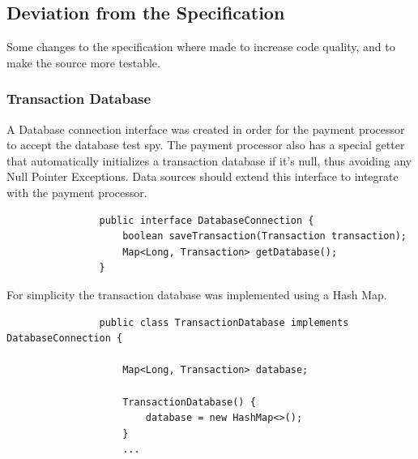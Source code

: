 \documentclass[11pt, a4paper]{article}
\begin{document}
    \subsection{Deviation from the Specification}
        Some changes to the specification where made to increase code quality, and to make the source more testable.
        \subsubsection{Transaction Database}
            A Database connection interface was created in order for the payment processor to accept the database test spy. The payment processor also has a special getter that automatically initializes a transaction database if it's null, thus avoiding any Null Pointer Exceptions. Data sources should extend this interface to integrate with the payment processor.
            \begin{lstlisting}
                public interface DatabaseConnection {
                    boolean saveTransaction(Transaction transaction);
                    Map<Long, Transaction> getDatabase();
                }
            \end{lstlisting}
            For simplicity the transaction database was implemented using a Hash Map. 
            \begin{lstlisting}
                public class TransactionDatabase implements DatabaseConnection {

                    Map<Long, Transaction> database;

                    TransactionDatabase() {
                        database = new HashMap<>();
                    }
                    ...
            \end{lstlisting}
\end{document}
